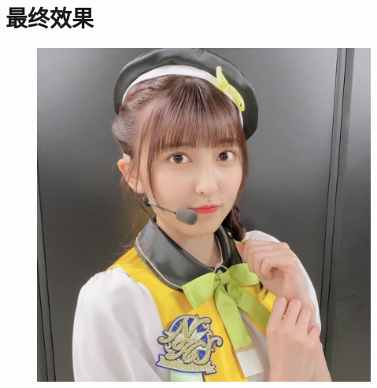\documentclass[12pt, a4paper, oneside]{ctexbook}
\begin{document}
		\chapter{最终效果}
		
		\begin{figure}[h]
			\centering
			\includegraphics[width=0.7\linewidth]{pic/test}
			\caption{}
			\label{fig:test}
		\end{figure}


	
	
\end{document}
